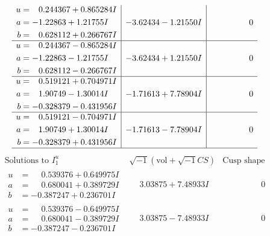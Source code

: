\documentclass[1p]{elsarticle_modified}
\theoremstyle{definition}
\newcommand{\I}{\sqrt{-1}}
\begin{document}
$$\begin{array}{c|c|c}
\begin{aligned}
u &= \phantom{-}0.244367 + 0.865284 I \\
a &= -1.22863 + 1.21755 I \\
b &= \phantom{-}0.628112 + 0.266767 I\end{aligned}
 & -3.62434 - 1.21550 I & \phantom{-0.000000 } 0 \\ \hline\begin{aligned}
u &= \phantom{-}0.244367 - 0.865284 I \\
a &= -1.22863 - 1.21755 I \\
b &= \phantom{-}0.628112 - 0.266767 I\end{aligned}
 & -3.62434 + 1.21550 I & \phantom{-0.000000 } 0 \\ \hline\begin{aligned}
u &= \phantom{-}0.519121 + 0.704971 I \\
a &= \phantom{-}1.90749 - 1.30014 I \\
b &= -0.328379 - 0.431956 I\end{aligned}
 & -1.71613 + 7.78904 I & \phantom{-0.000000 } 0 \\ \hline\begin{aligned}
u &= \phantom{-}0.519121 - 0.704971 I \\
a &= \phantom{-}1.90749 + 1.30014 I \\
b &= -0.328379 + 0.431956 I\end{aligned}
 & -1.71613 - 7.78904 I & \phantom{-0.000000 } 0\\
 \hline 
 \end{array}$$\newpage$$\begin{array}{c|c|c}  
\text{Solutions to }I^u_{1}& \I (\text{vol} + \sqrt{-1}CS) & \text{Cusp shape}\\
 \hline 
\begin{aligned}
u &= \phantom{-}0.539376 + 0.649975 I \\
a &= \phantom{-}0.680041 + 0.389729 I \\
b &= -0.387247 + 0.236701 I\end{aligned}
 & \phantom{-}3.03875 + 7.48933 I & \phantom{-0.000000 } 0 \\ \hline\begin{aligned}
u &= \phantom{-}0.539376 - 0.649975 I \\
a &= \phantom{-}0.680041 - 0.389729 I \\
b &= -0.387247 - 0.236701 I\end{aligned}
 & \phantom{-}3.03875 - 7.48933 I & \phantom{-0.000000 } 0 \\ \hline\begin{aligned}

\end{aligned}
\end{array}$$
\end{document}
